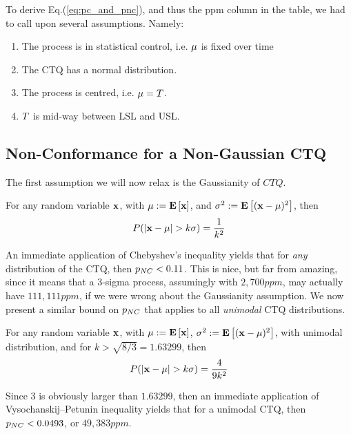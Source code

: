 \bigskip

To derive Eq.(\ref{eq:pc_and_pnc}), and thus the ppm column in the table, we had to call upon several assumptions.
Namely:
\begin{enumerate}
\item The process is in statistical control, i.e. $\mu$ is fixed over time
\item The CTQ has a normal distribution.
\item The process is centred, i.e. $\mu=T$.
\item $T$ is mid-way between LSL and USL.
\end{enumerate}








\subsection{Non-Conformance for a Non-Gaussian CTQ}
The first assumption we will now relax is the Gaussianity of $CTQ$. 

\begin{theorem}
For any random variable $\mathbf{x}$, with $\mu:=\mathbf{E}\left[ \mathbf{x} \right]$, and $\sigma^2:=\mathbf{E}\left[ (\mathbf{x}-\mu)^2 \right]$, then
\begin{align}
	P(|\x-\mu|>k\sigma)=\frac{1}{k^2}
\end{align}
\end{theorem}
An immediate application of Chebyshev's inequality yields that for \emph{any} distribution of the CTQ, then $p_{NC}<0.11$.
This is nice, but far from amazing, since it means that a 3-sigma process, assumingly with $2,700 ppm$, may actually have $111,111 ppm$, if we were wrong about the Gaussianity assumption.
We now present a similar bound on $p_{NC}$ that applies to all \emph{unimodal} CTQ distributions.

\begin{theorem}
For any random variable $\mathbf{x}$, with $\mu:=\mathbf{E}\left[ \mathbf{x} \right]$, $\sigma^2:=\mathbf{E}\left[ (\mathbf{x}-\mu)^2 \right]$, with unimodal distribution, and for $k>\sqrt{8/3}=1.63299$, then 
\begin{align}
	P(|\x-\mu|>k\sigma)=\frac{4}{9 k^2}
\end{align}
\end{theorem}
Since $3$ is obviously larger than $1.63299$, then an immediate application of Vysochanskij–Petunin inequality yields that for a unimodal CTQ, then $p_{NC}<0.0493$, or $49,383 ppm$.






